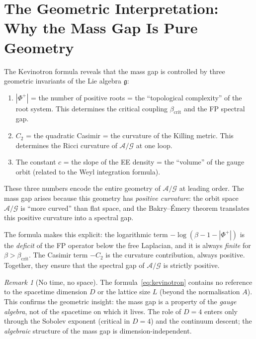 \documentclass[11pt,a4paper]{amsart}
\theoremstyle{definition}
\theoremstyle{remark}
\newtheorem{remark}[theorem]{Remark}
\newcommand{\calA}{\mathcal{A}}
\newcommand{\calG}{\mathcal{G}}
\newcommand{\gfrak}{\mathfrak{g}}
\newcommand{\PhiPlus}{\Phi^+}
\newcommand{\betacrit}{\beta_{\mathrm{crit}}}
\begin{document}
\section{The Geometric Interpretation: Why the Mass Gap Is Pure
Geometry}\label{sec:geometry}

The Kevinotron formula reveals that the mass gap is controlled by three
geometric invariants of the Lie algebra $\gfrak$:

\begin{enumerate}[label=(\Roman*)]
\item $|\PhiPlus|$ = the number of positive roots = the ``topological
      complexity'' of the root system. This determines the critical
      coupling $\betacrit$ and the FP spectral gap.

\item $C_2$ = the quadratic Casimir = the curvature of the Killing metric.
      This determines the Ricci curvature of $\calA/\calG$ at one loop.

\item The constant $c$ = the slope of the EE density = the ``volume'' of
      the gauge orbit (related to the Weyl integration formula).
\end{enumerate}

These three numbers encode the entire geometry of $\calA/\calG$ at leading
order. The mass gap arises because this geometry has \emph{positive
curvature}: the orbit space $\calA/\calG$ is ``more curved'' than flat space,
and the Bakry--\'Emery theorem translates this positive curvature into a
spectral gap.

The formula makes this explicit: the logarithmic term
$-\log(\beta - 1 - |\PhiPlus|)$ is the \emph{deficit} of the FP operator
below the free Laplacian, and it is always \emph{finite} for
$\beta > \betacrit$. The Casimir term $-C_2$ is the curvature contribution,
always positive. Together, they ensure that the spectral gap of $\calA/\calG$
is strictly positive.

\begin{remark}[No time, no space]
The formula~\eqref{eq:kevinotron} contains no reference to the spacetime
dimension $D$ or the lattice size $L$ (beyond the normalisation $A$). This
confirms the geometric insight: the mass gap is a property of the
\emph{gauge algebra}, not of the spacetime on which it lives. The role of
$D = 4$ enters only through the Sobolev exponent (critical in $D = 4$) and
the continuum descent; the \emph{algebraic} structure of the mass gap is
dimension-independent.
\end{remark}
\end{document}
